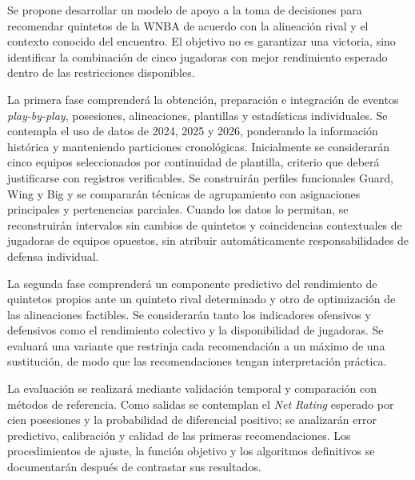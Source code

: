 Se propone desarrollar un modelo de apoyo a la toma de decisiones para recomendar quintetos de la WNBA de acuerdo con la alineación rival y el contexto conocido del encuentro. El objetivo no es garantizar una victoria, sino identificar la combinación de cinco jugadoras con mejor rendimiento esperado dentro de las restricciones disponibles.

La primera fase comprenderá la obtención, preparación e integración de eventos \textit{play-by-play}, posesiones, alineaciones, plantillas y estadísticas individuales. Se contempla el uso de datos de 2024, 2025 y 2026, ponderando la información histórica y manteniendo particiones cronológicas. Inicialmente se considerarán cinco equipos seleccionados por continuidad de plantilla, criterio que deberá justificarse con registros verificables. Se construirán perfiles funcionales Guard, Wing y Big y se compararán técnicas de agrupamiento con asignaciones principales y pertenencias parciales. Cuando los datos lo permitan, se reconstruirán intervalos sin cambios de quintetos y coincidencias contextuales de jugadoras de equipos opuestos, sin atribuir automáticamente responsabilidades de defensa individual.

La segunda fase comprenderá un componente predictivo del rendimiento de quintetos propios ante un quinteto rival determinado y otro de optimización de las alineaciones factibles. Se considerarán tanto los indicadores ofensivos y defensivos como el rendimiento colectivo y la disponibilidad de jugadoras. Se evaluará una variante que restrinja cada recomendación a un máximo de una sustitución, de modo que las recomendaciones tengan interpretación práctica.

La evaluación se realizará mediante validación temporal y comparación con métodos de referencia. Como salidas se contemplan el \textit{Net Rating} esperado por cien posesiones y la probabilidad de diferencial positivo; se analizarán error predictivo, calibración y calidad de las primeras recomendaciones. Los procedimientos de ajuste, la función objetivo y los algoritmos definitivos se documentarán después de contrastar sus resultados.